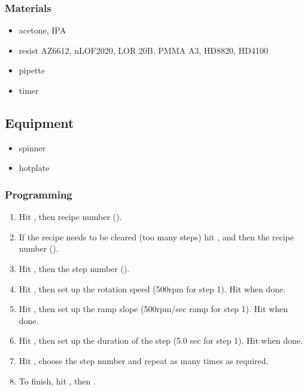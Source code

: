 \subsubsection{Materials}
\begin{itemize} [noitemsep]
\item acetone, IPA
\item resist AZ6612, nLOF2020, LOR 20B, PMMA A3, HD8820, HD4100
\item pipette
\item timer
\end{itemize}

\subsection{Equipment}
\begin{itemize}[noitemsep]
	\item spinner
	\item hotplate
\end{itemize}

\subsubsection{Programming}
\begin{enumerate}
  \item Hit , then recipe number ().
  \item If the recipe needs to be cleared (too many steps) hit ,  and then the recipe number ().
  \item Hit , then the step number ().
  \item Hit , then set up the rotation speed (500rpm for step 1). Hit  when done.
  \item Hit , then set up the ramp slope (500rpm/sec ramp for step 1). Hit  when done.
  \item Hit , then set up the duration of the step (5.0 sec for step 1). Hit  when done.
  \item Hit , choose the step number and repeat as many times as required.
  \item To finish, hit , then .
\end{enumerate}

